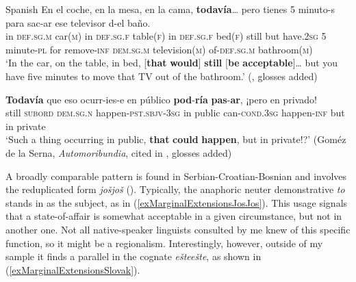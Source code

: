 \begin{exe}
	\ex 
	\begin{xlist}
	\exi{}Spanish
	\ex\label{exMarginalExtensionsSpanishLimits1}
	\gll En el coche, en la mesa, en la cama, \textbf{todavía}… pero tienes 5 minuto-s para sac-ar ese televisor d-el baño.\\
	in \textsc{def}.\textsc{sg}.\textsc{m} car(\textsc{m}) in \textsc{def}.\textsc{sg}.\textsc{f} table(\textsc{f}) in \textsc{def}.\textsc{sg}.\textsc{f} bed(\textsc{f}) still but have.2\textsc{sg} 5 minute-\textsc{pl} for remove-\textsc{inf} \textsc{dem}.\textsc{sg}.\textsc{m} television(\textsc{m}) of-\textsc{def}.\textsc{sg}.\textsc{m} bathroom(\textsc{m})\\
	\glt \lq In the car, on the table, in bed,	 [\textbf{that} \textbf{would}] \textbf{still} [\textbf{be} \textbf{acceptable}]… but you have five minutes to move that TV out of the bathroom.' (\cite{Deloor2012}, glosses added)

	\ex\label{exMarginalExtensionsSpanishLimits2}
	\gll \textbf{Todavía} que eso ocurr-ies-e en público \textbf{pod}-\textbf{ría} \textbf{pas}-\textbf{ar}, ¡pero en privado!\\
	still \textsc{subord} \textsc{dem}.\textsc{sg}.\textsc{n} happen-\textsc{pst}.\textsc{sbjv}-3\textsc{sg} in public can-\textsc{cond}.3\textsc{sg} happen-\textsc{inf} \phantom{¡}but in private\\
	\glt \lq Such a thing occurring in public, \textbf{that} \textbf{could} \textbf{happen}, but in private!?' (Goméz de la Serna, \textit{Automoribundia}, cited in \cite[222]{Bosque2016}, glosses added)
	\end{xlist}
\end{exe}

A broadly comparable pattern is found in Serbian-Croatian-Bosnian and involves the reduplicated form \textit{jošjoš} (). Typically, the anaphoric neuter demonstrative \textit{to} stands in as the subject, as in (\ref{exMarginalExtensionsJosJos}). This usage signals that a state-of-affair is somewhat acceptable in a given circumstance, but not in another one. Not all native-speaker linguists consulted by me knew of this specific function, so it might be a regionalism. Interestingly, however, outside of my sample it finds a parallel in the  cognate \textit{ešteešte}, as shown in (\ref{exMarginalExtensionsSlovak}).

